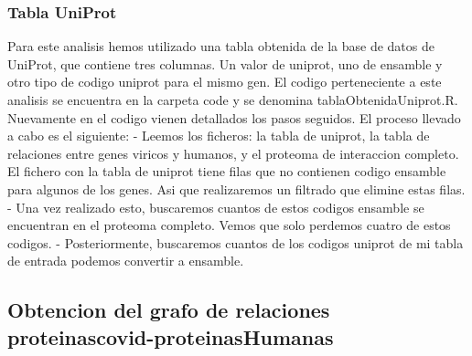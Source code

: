 \subsubsection{Tabla UniProt}
Para este analisis hemos utilizado una tabla obtenida de la base de datos de UniProt, que contiene tres columnas. Un valor de uniprot, uno de ensamble y otro tipo de codigo uniprot para el mismo gen. 
El codigo perteneciente a este analisis se encuentra en la carpeta code y se denomina tablaObtenidaUniprot.R. Nuevamente en el codigo vienen detallados los pasos seguidos. 
El proceso llevado a cabo es el siguiente:
- Leemos los ficheros: la tabla de uniprot, la tabla de relaciones entre genes viricos y humanos, y el proteoma de interaccion completo. El fichero con la tabla de uniprot tiene filas que no contienen codigo ensamble para algunos de los genes. Asi que realizaremos un filtrado que elimine estas filas.
- Una vez realizado esto, buscaremos cuantos de estos codigos ensamble se encuentran en el proteoma completo. Vemos que solo perdemos cuatro de estos codigos.
- Posteriormente, buscaremos cuantos de los codigos uniprot de mi tabla de entrada podemos convertir a ensamble. 


\subsection{Obtencion del grafo de relaciones proteinascovid-proteinasHumanas}

